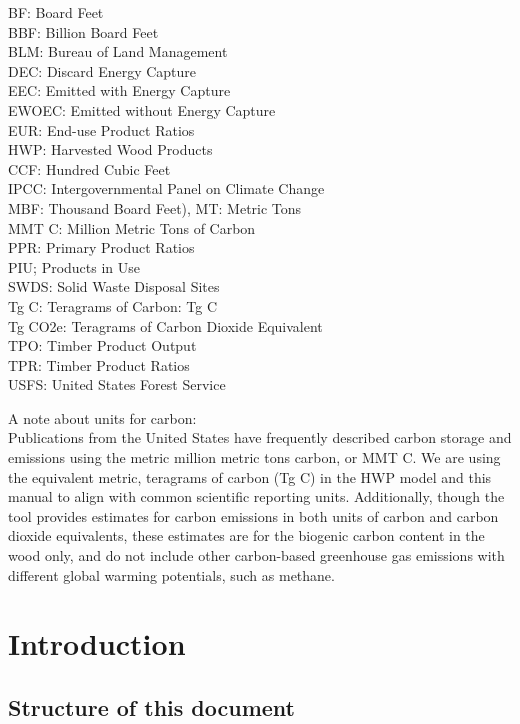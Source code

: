 \documentclass[
  openany]{book}
\begin{document}
BF: Board Feet\\
BBF: Billion Board Feet\\
BLM: Bureau of Land Management\\
DEC: Discard Energy Capture\\
EEC: Emitted with Energy Capture\\
EWOEC: Emitted without Energy Capture\\
EUR: End-use Product Ratios\\
HWP: Harvested Wood Products\\
CCF: Hundred Cubic Feet\\
IPCC: Intergovernmental Panel on Climate Change\\
MBF: Thousand Board Feet),
MT: Metric Tons\\
MMT C: Million Metric Tons of Carbon\\
PPR: Primary Product Ratios\\
PIU; Products in Use\\
SWDS: Solid Waste Disposal Sites\\
Tg C: Teragrams of Carbon: Tg C\\
Tg CO2e: Teragrams of Carbon Dioxide Equivalent\\
TPO: Timber Product Output\\
TPR: Timber Product Ratios\\
USFS: United States Forest Service

A note about units for carbon:\\
Publications from the United States have frequently described carbon storage and emissions using the metric million metric tons carbon, or MMT C. We are using the equivalent metric, teragrams of carbon (Tg C) in the HWP model and this manual to align with common scientific reporting units. Additionally, though the tool provides estimates for carbon emissions in both units of carbon and carbon dioxide equivalents, these estimates are for the biogenic carbon content in the wood only, and do not include other carbon-based greenhouse gas emissions with different global warming potentials, such as methane.

\hypertarget{int}{%
\chapter{Introduction}\label{int}}

\hypertarget{int-struc}{%
\section{Structure of this document}\label{int-struc}}
\end{document}
